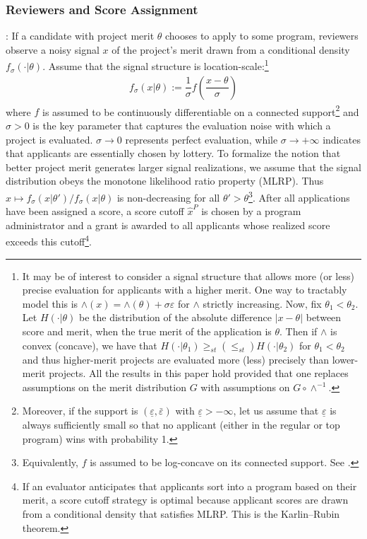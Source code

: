 \documentclass[12pt,reqno]{amsart}
\theoremstyle{definition}
\theoremstyle{plain} %
\begin{document}
\subsubsection{Reviewers and Score Assignment}: If a candidate with project merit $\theta$ chooses to apply to some program, reviewers observe a noisy signal $x$ of the project's merit drawn from a conditional density $f_{\sigma}(\cdot|\theta)$. Assume that the signal structure is location-scale:\footnote{It may be of interest to consider a signal structure that allows more (or less) precise evaluation for applicants with a higher merit. One way to tractably model this is $\wedge(x) = \wedge(\theta) + \sigma\varepsilon$ for $\wedge$ strictly increasing. Now, fix $\theta_1<\theta_2$. Let $H(\cdot|\theta)$ be the distribution of the absolute difference $|x-\theta|$ between score and merit, when the true merit of the application is $\theta$. Then if $\wedge$ is convex (concave), we have that $H(\cdot|\theta_1) \geq_{st} (\leq_{st}) H(\cdot|\theta_2)$ for $\theta_1<\theta_2$ and thus higher-merit projects are evaluated more (less) precisely than lower-merit projects. All the results in this paper hold provided that one replaces assumptions on the merit distribution $G$ with assumptions on $G\circ \wedge^{-1}$.}
\begin{align*}
  f_{\sigma}(x|\theta) := \dfrac{1}{\sigma}f\left(\dfrac{x-\theta}{\sigma}\right)
\end{align*}
where $f$ is assumed to be continuously differentiable on a connected support\footnote{Moreover, if the support is $(\underline{\varepsilon},\bar{\varepsilon})$ with $\underline{\varepsilon}>-\infty$, let us assume that $\underline{\varepsilon}$ is always sufficiently small so that no applicant (either in the regular or top program) wins with probability 1.} and $\sigma>0$ is the key parameter that captures the evaluation noise with which a project is evaluated. $\sigma \rightarrow 0$ represents perfect evaluation, while $\sigma\rightarrow +\infty$ indicates that applicants are essentially chosen by lottery. To formalize the notion that better project merit generates larger signal realizations, we assume that the signal distribution obeys the monotone likelihood ratio property (MLRP). Thus $x\mapsto f_{\sigma}(x|\theta')/f_{\sigma}(x|\theta)$ is non-decreasing for all $\theta'>\theta$\footnote{Equivalently, $f$ is assumed to be log-concave on its connected support. See \citet{saumard2014logconcavity}.}. After all applications have been assigned a score, a score cutoff $\hat{x}^{P}$ is chosen by a program administrator and a grant is awarded to all applicants whose realized score exceeds this cutoff\footnote{If an evaluator anticipates that applicants sort into a program based on their merit, a score cutoff strategy is optimal because applicant scores are drawn from a conditional density that satisfies MLRP. This is the Karlin--Rubin theorem.}. 
\end{document}
